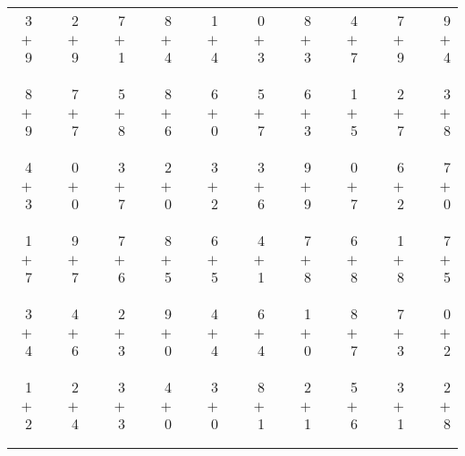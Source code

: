 \documentclass[12pt, letterpaper]{article}
\begin{document}
\begin{tabular}{rrrrrrrrrrrrrrrrrrr}
3 & & 2 & & 7 & & 8 & & 1 & & 0 & & 8 & & 4 & & 7 & & 9\\
$+$ 9 & & $+$ 9 & & $+$ 1 & & $+$ 4 & & $+$ 4 & & $+$ 3 & & $+$ 3 & & $+$ 7 & & $+$ 9 & & $+$ 4\\
\cline{1-1} \cline{3-3} \cline{5-5} \cline{7-7} \cline{9-9} \cline{11-11} \cline{13-13} \cline{15-15} \cline{17-17} \cline{19-19} \\ \\
8 & & 7 & & 5 & & 8 & & 6 & & 5 & & 6 & & 1 & & 2 & & 3\\
$+$ 9 & & $+$ 7 & & $+$ 8 & & $+$ 6 & & $+$ 0 & & $+$ 7 & & $+$ 3 & & $+$ 5 & & $+$ 7 & & $+$ 8\\
\cline{1-1} \cline{3-3} \cline{5-5} \cline{7-7} \cline{9-9} \cline{11-11} \cline{13-13} \cline{15-15} \cline{17-17} \cline{19-19} \\ \\
4 & & 0 & & 3 & & 2 & & 3 & & 3 & & 9 & & 0 & & 6 & & 7\\
$+$ 3 & & $+$ 0 & & $+$ 7 & & $+$ 0 & & $+$ 2 & & $+$ 6 & & $+$ 9 & & $+$ 7 & & $+$ 2 & & $+$ 0\\
\cline{1-1} \cline{3-3} \cline{5-5} \cline{7-7} \cline{9-9} \cline{11-11} \cline{13-13} \cline{15-15} \cline{17-17} \cline{19-19} \\ \\
1 & & 9 & & 7 & & 8 & & 6 & & 4 & & 7 & & 6 & & 1 & & 7\\
$+$ 7 & & $+$ 7 & & $+$ 6 & & $+$ 5 & & $+$ 5 & & $+$ 1 & & $+$ 8 & & $+$ 8 & & $+$ 8 & & $+$ 5\\
\cline{1-1} \cline{3-3} \cline{5-5} \cline{7-7} \cline{9-9} \cline{11-11} \cline{13-13} \cline{15-15} \cline{17-17} \cline{19-19} \\ \\
3 & & 4 & & 2 & & 9 & & 4 & & 6 & & 1 & & 8 & & 7 & & 0\\
$+$ 4 & & $+$ 6 & & $+$ 3 & & $+$ 0 & & $+$ 4 & & $+$ 4 & & $+$ 0 & & $+$ 7 & & $+$ 3 & & $+$ 2\\
\cline{1-1} \cline{3-3} \cline{5-5} \cline{7-7} \cline{9-9} \cline{11-11} \cline{13-13} \cline{15-15} \cline{17-17} \cline{19-19} \\ \\
1 & & 2 & & 3 & & 4 & & 3 & & 8 & & 2 & & 5 & & 3 & & 2\\
$+$ 2 & & $+$ 4 & & $+$ 3 & & $+$ 0 & & $+$ 0 & & $+$ 1 & & $+$ 1 & & $+$ 6 & & $+$ 1 & & $+$ 8\\
\cline{1-1} \cline{3-3} \cline{5-5} \cline{7-7} \cline{9-9} \cline{11-11} \cline{13-13} \cline{15-15} \cline{17-17} \cline{19-19} \\ \\

\end{tabular}
\end{document}
